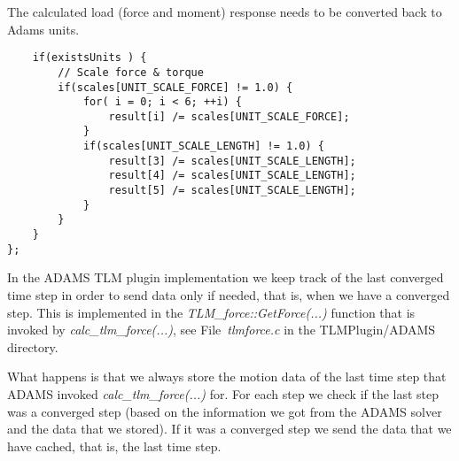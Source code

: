 The calculated load (force and moment) response needs to be converted
back to Adams units.

{
\scriptsize
\begin{verbatim}
    if(existsUnits ) {
        // Scale force & torque
        if(scales[UNIT_SCALE_FORCE] != 1.0) {
            for( i = 0; i < 6; ++i) {
                result[i] /= scales[UNIT_SCALE_FORCE];
            }
            if(scales[UNIT_SCALE_LENGTH] != 1.0) {
                result[3] /= scales[UNIT_SCALE_LENGTH];
                result[4] /= scales[UNIT_SCALE_LENGTH];
                result[5] /= scales[UNIT_SCALE_LENGTH];
            }
        }
    }
};
\end{verbatim}
}


In the ADAMS TLM plugin implementation we keep track of the last
converged time step in order to send data only if needed, that is,
when we have a converged step. This is implemented in the
{\em TLM\_force::GetForce(...)} function that is invoked by {\em
  calc\_tlm\_force(...)}, see File~{\em tlmforce.c} in the TLMPlugin/ADAMS
directory.

What happens is that we always store the motion data of the last time
step that ADAMS invoked {\em calc\_tlm\_force(...)} for. For each step
we check if the last step was a converged step (based on the
information we got from the ADAMS solver and the data that we stored).
If it was a converged step we send the data that we have cached, that
is, the last time step.

